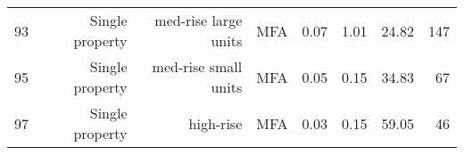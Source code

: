 \begin{tabular}{ p{0.5in} r r p{1in} p{0.75in} p{0.75in} rr}
        93 & Single property & med-rise large units & MFA &       0.07 &       1.01 &      24.82 &        147 \\

        95 & Single property & med-rise small units & MFA &       0.05 &       0.15 &      34.83 &         67 \\

        97 & Single property &  high-rise & MFA &       0.03 &       0.15 &      59.05 &         46 \\
\hline

\end{tabular}  

